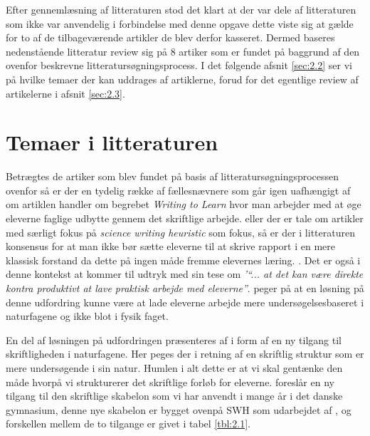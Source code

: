 Efter gennemlæsning af litteraturen stod det klart at der var dele af litteraturen som ikke var anvendelig i forbindelse med denne opgave dette viste sig at gælde for to af de tilbageværende artikler de blev derfor kasseret. Dermed baseres nedenstående litteratur review sig på 8 artiker som er fundet på baggrund af den ovenfor beskrevne litteratursøgningsprocess. I det følgende afsnit \vref{sec:2.2} ser vi på hvilke temaer der kan uddrages af artiklerne, forud for det egentlige review af artikelerne i afsnit \vref{sec:2.3}. 


\section{Temaer i litteraturen}
\label{sec:2.3}

Betrægtes de artiker som blev fundet på basis af litteratursøgningsprocessen ovenfor så er der en tydelig række af fællesnævnere som går igen uafhængigt af om artiklen handler om begrebet \emph{Writing to Learn} hvor man arbejder med at øge eleverne faglige udbytte gennem det skriftlige arbejde. eller der er tale om artikler med særligt fokus på \emph{science writing heuristic} som fokus, så er der i litteraturen konsensus for at man ikke bør sætte eleverne til at skrive rapport i en mere klassisk forstand da dette på ingen måde fremme elevernes læring. \citep{Akkus2007, Atasoy2013, Burke2005, Keys1999}. Det er også i denne kontekst at \citet{Hodson2008} kommer til udtryk med sin tese om \emph{'``... at det kan være direkte kontra produktivt at lave praktisk arbejde med eleverne''}. \citet{Krogh2016,Dolin2014} peger på at en løsning på denne udfordring kunne være at lade eleverne arbejde mere undersøgelsesbaseret i naturfagene og ikke blot i fysik faget. 

En del af løsningen på udfordringen præsenteres af \citep{Keys1999, Burke2005} i form af en ny tilgang til skriftligheden i naturfagene. Her peges der i retning af en skriftlig struktur som er mere undersøgende i sin natur. Humlen i alt dette er at vi skal gentænke den måde hvorpå vi strukturerer det skriftlige forløb for eleverne. \citet{Burke2005} foreslår en ny tilgang til den skriftlige skabelon som vi har anvendt i mange år i det danske gymnasium, denne nye skabelon er bygget ovenpå SWH som udarbejdet af \citep{Keys1999}, og forskellen mellem de to tilgange er givet i tabel \vref{tbl:2.1}.

